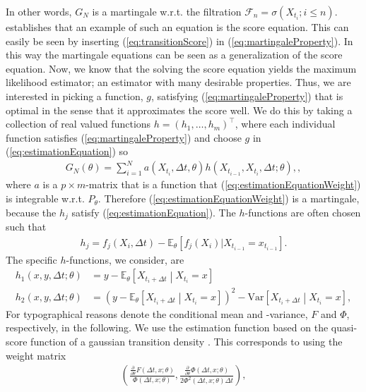 In other words, $G_N$ is a martingale w.r.t. the filtration $\mathcal{F}_n = \sigma\left(X_{t_i}; i \leq n\right)$. \cite[p. 11]{StatisticalMethodsForSDE} establishes that an example of such an equation is the score equation. This can easily be seen by inserting (\ref{eq:transitionScore}) in (\ref{eq:martingaleProperty}). In this way the martingale equations can be seen as a generalization of the score equation. Now, we know that the solving the score equation yields the maximum likelihood estimator; an estimator with many desirable properties. Thus, we are interested in picking a function, $g$, satisfying (\ref{eq:martingaleProperty}) that is optimal in the sense that it approximates the score well. We do this by taking a collection of real valued functions $h = (h_1, \dots, h_m)^\top$, where each individual function satisfies (\ref{eq:martingaleProperty}) and choose $g$ in (\ref{eq:estimationEquation}) so
\begin{align}
    G_N(\theta) = \sum_{i = 1}^N a\left(X_{t_i}, \Delta t, \theta \right)h(X_{t_{i - 1}}, X_{t_i}, \Delta t; \theta), \label{eq:estimationEquationWeight},
\end{align}
where $a$ is a $p\times m$-matrix that is a function that (\ref{eq:estimationEquationWeight}) is integrable w.r.t. $P_\theta$. Therefore (\ref{eq:estimationEquationWeight}) is a martingale, because the $h_j$ satisfy (\ref{eq:estimationEquation}). The $h$-functions are often chosen such that
\begin{align}
    h_j = f_j(X_i, \Delta t) - \mathbb{E}_\theta\left[f_j(X_i)| X_{t_{i - 1}} = x_{t_{i - 1}}\right].
\end{align}
The specific $h$-functions, we consider, are
\begin{align}
    h_1(x,y, \Delta t; \theta) &= y - \mathbb{E}_\theta\left[X_{t_i + \Delta t} \middle| X_{t_{i}} = x\right] \\
    h_2(x,y, \Delta t; \theta) &= \left(y - \mathbb{E}_\theta\left[X_{t_i + \Delta t} \middle| X_{t_{i}} = x\right]\right)^2 - \mathrm{Var}\left[X_{t_i + \Delta t} \middle| X_{t_{i}} = x\right],
\end{align}
For typographical reasons denote the conditional mean and -variance, $F$ and $\Phi$, respectively, in the following.
 We use the estimation function based on the quasi-score function of a gaussian transition density \cite[equation (1.28)]{StatisticalMethodsForSDE}. This corresponds to using the weight matrix
 \begin{align}
    \left(\frac{\frac{\partial}{\partial\theta}F(\Delta t, x;\theta)}{\Phi\left(\Delta t, x; \theta\right)} , \frac{\frac{\partial}{\partial\theta}\Phi(\Delta t, x;\theta)}{2\Phi^2(\Delta t, x;\theta)\Delta t} \right),
\end{align}
